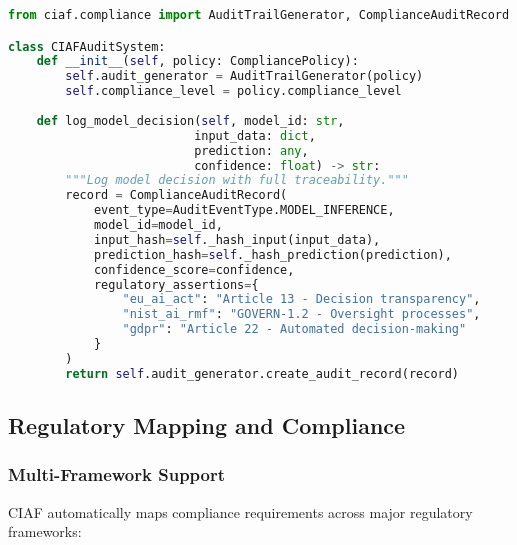 \documentclass[12pt,a4paper]{article}
\begin{document}
\begin{lstlisting}[language=Python, caption=Audit Trail Implementation]
from ciaf.compliance import AuditTrailGenerator, ComplianceAuditRecord

class CIAFAuditSystem:
    def __init__(self, policy: CompliancePolicy):
        self.audit_generator = AuditTrailGenerator(policy)
        self.compliance_level = policy.compliance_level
    
    def log_model_decision(self, model_id: str, 
                          input_data: dict, 
                          prediction: any,
                          confidence: float) -> str:
        """Log model decision with full traceability."""
        record = ComplianceAuditRecord(
            event_type=AuditEventType.MODEL_INFERENCE,
            model_id=model_id,
            input_hash=self._hash_input(input_data),
            prediction_hash=self._hash_prediction(prediction),
            confidence_score=confidence,
            regulatory_assertions={
                "eu_ai_act": "Article 13 - Decision transparency",
                "nist_ai_rmf": "GOVERN-1.2 - Oversight processes",
                "gdpr": "Article 22 - Automated decision-making"
            }
        )
        return self.audit_generator.create_audit_record(record)
\end{lstlisting}

\subsection{Regulatory Mapping and Compliance}

\subsubsection{Multi-Framework Support}

CIAF automatically maps compliance requirements across major regulatory frameworks:
\end{document}

